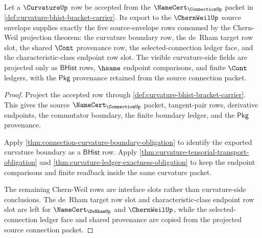 \begin{theorem}
\label{thm:curvature-chernweil-source-envelope-row}
Let a $\CurvatureUp$ row be accepted from the $\NameCert_{\ConnectionUp}$ packet in \autoref{def:curvature-bhist-bracket-carrier}. Its export to the $\ChernWeilUp$ source envelope supplies exactly the five source-envelope rows consumed by the Chern-Weil projection theorem: the curvature boundary row, the de~Rham target row slot, the shared $\Cont$ provenance row, the selected-connection ledger face, and the characteristic-class endpoint row slot. The visible curvature-side fields are projected only as $\mathsf{BHist}$ rows, $\hsame$ endpoint comparisons, and finite $\Cont$ ledgers, with the $\mathsf{Pkg}$ provenance retained from the source connection packet.
\end{theorem}
\begin{proof}
Project the accepted row through \autoref{def:curvature-bhist-bracket-carrier}. This gives the source $\NameCert_{\ConnectionUp}$ packet, tangent-pair rows, derivative endpoints, the commutator boundary, the finite boundary ledger, and the $\mathsf{Pkg}$ provenance.

Apply \autoref{thm:connection-curvature-boundary-obligation} to identify the exported curvature boundary as a $\mathsf{BHist}$ row. Apply \autoref{thm:curvature-tensorial-transport-obligation} and \autoref{thm:curvature-ledger-exactness-obligation} to keep the endpoint comparisons and finite readback inside the same curvature packet.

The remaining Chern-Weil rows are interface slots rather than curvature-side conclusions. The de~Rham target row slot and characteristic-class endpoint row slot are left for $\NameCert_{\DeRhamUp}$ and $\ChernWeilUp$, while the selected-connection ledger face and shared provenance are copied from the projected source connection packet.
\end{proof}

